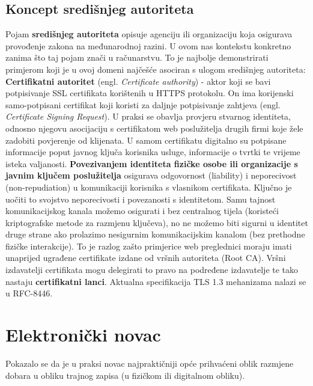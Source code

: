 \documentclass[utf8, zavrsni]{fer}
\begin{document}
\section{Koncept središnjeg autoriteta}
Pojam \textbf{središnjeg autoriteta} opisuje agenciju ili organizaciju koja osigurava provođenje zakona na međunarodnoj razini\cite{enwiki:969028445}. U ovom nas kontekstu konkretno zanima što taj pojam znači u računarstvu. To je najbolje demonstrirati primjerom koji je u ovoj domeni najčešće asociran s ulogom središnjeg autoriteta: \textbf{Certifikatni autoritet} (engl. \textit{Certificate authority}) - aktor koji se bavi potpisivanje SSL certifikata korištenih u HTTPS protokolu. On ima korijenski samo-potpisani certifikat koji koristi za daljnje potpisivanje zahtjeva (engl. \textit{Certificate Signing Request}). U praksi se obavlja provjeru stvarnog identiteta, odnosno njegovu asocijaciju s certifikatom web poslužitelja drugih firmi koje žele zadobiti povjerenje od klijenata. U samom certifikatu digitalno su potpisane informacije poput javnog ključa korisnika usluge, informacije o tvrtki te vrijeme isteka valjanosti. \textbf{Povezivanjem identiteta fizičke osobe ili organizacije s javnim ključem poslužitelja} osigurava odgovornost (liability) i neporecivost (non-repudiation) u komunikaciji korisnika s vlasnikom certifikata. Ključno je uočiti to svojstvo neporecivosti i povezanosti s identitetom. Samu tajnost komunikacijskog kanala možemo osigurati i bez centralnog tijela (koristeći kriptografske metode za razmjenu ključeva), no ne možemo biti sigurni u identitet druge strane ako prolazimo nesigurnim komunikacijskim kanalom (bez prethodne fizičke interakcije). To je razlog zašto primjerice web preglednici moraju imati unaprijed ugrađene certifikate izdane od vršnih autoriteta (Root CA). Vršni izdavatelji certifikata mogu delegirati to pravo na podređene izdavatelje te tako nastaju \textbf{certifikatni lanci}. Aktualna specifikacija TLS 1.3 mehanizama nalazi se u RFC-8446.


\chapter{Elektronički novac}

Pokazalo se da je u praksi novac najpraktičniji opće prihvaćeni oblik razmjene dobara u obliku trajnog zapisa (u fizičkom ili digitalnom obliku).
\end{document}
